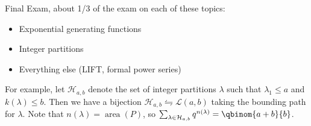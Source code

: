 \documentclass[11pt, a4paper]{memoir}
\theoremstyle{change}
\theoremstyle{plain}
\theoremstyle{nonumberplain}
\numberwithin{equation}{section}
\begin{document}
Final Exam, about 1/3 of the exam on each of these topics:
\begin{itemize}[nl]
    \item Exponential generating functions
    \item Integer partitions
    \item Everything else (LIFT, formal power series)
\end{itemize}
For example, let $\mathcal{H}_{a,b}$ denote the set of integer partitions $\lambda$ such that $\lambda_1\leq a$ and $k(\lambda)\leq b$.
Then we have a bijection $\mathcal{H}_{a,b}\leftrightharpoons\mathcal{L}(a,b)$ taking the bounding path for $\lambda$.
Note that $n(\lambda)=\operatorname{area}(P)$, so $\sum_{\lambda\in\mathcal{H}_{a,b}}q^{n(\lambda)}=\qbinom{a+b}{b}$.
\end{document}
